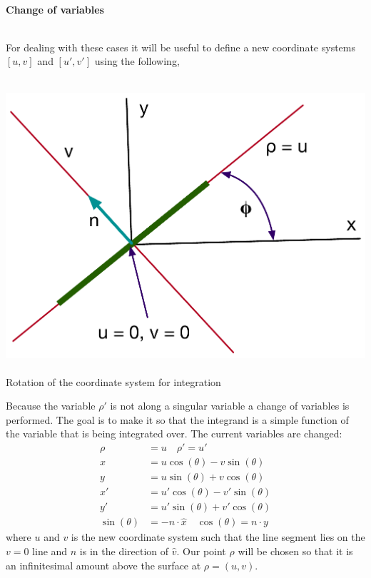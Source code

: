 \documentclass{article}
\newcommand{\0}{\varnothing}
\begin{document}
{\ \\ \centering \bf Change of variables\ \\ \ \\}

For dealing with these cases it will be useful to define a new coordinate systems $[u,v]$ and $[u',v']$ using the following,\\ \

\begin{minipage}{0.3\textwidth}
\begin{center}
\includegraphics[width=1\columnwidth]{figures/Seg}\ \\
Rotation of the coordinate system for integration
\end{center}
\end{minipage}
\begin{minipage}{0.7\textwidth}
Because the variable $\rho'$ is not along a singular variable a change of variables is performed. The goal is to make it so that the integrand is a simple function of the variable that is being integrated over. The current variables are changed:
\begin{align*}
    \rho &= u \quad  \rho' = u'\\
    x &= u\cos(\theta) - v\sin(\theta)\\
    y &= u\sin(\theta) + v\cos(\theta)\\
    x' &= u'\cos(\theta) - v'\sin(\theta)\\
    y' &= u'\sin(\theta) + v'\cos(\theta)\\
    \sin(\theta) &= - n \cdot \hat x \quad \cos(\theta) = n \cdot y
\end{align*}
\noindent where $u$ and $v$ is the new coordinate system such that the line segment lies on the $v = 0$ line and $\hat{n}$ is in the direction of $\hat{v}$. Our point $\rho$ will be chosen so that it is an infinitesimal amount above the surface at $\rho = (u,v)$. 
\end{minipage}
\end{document}
